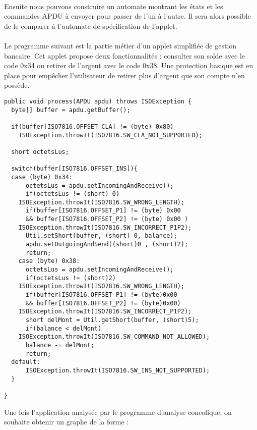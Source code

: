 \paragraph{}
Ensuite nous pouvons construire un automate montrant les états et les commandes \gls{APDU} à envoyer pour passer de l’un à l’autre. Il sera alors possible de le comparer à l’automate de spécification de l’applet.

\paragraph{}
Le programme suivant est la partie métier d’un applet simplifiée de gestion bancaire. Cet applet propose deux fonctionnalités : consulter son solde avec le code 0x34 ou retirer de l’argent avec le code 0x38. Une protection basique est en place pour empêcher l’utilisateur de retirer plus d’argent que son compte n’en possède.

\begin{verbatim}
public void process(APDU apdu) throws ISOException {
  byte[] buffer = apdu.getBuffer();
      
  if(buffer[ISO7816.OFFSET_CLA] != (byte) 0x80)
    ISOException.throwIt(ISO7816.SW_CLA_NOT_SUPPORTED);
      
  short octetsLus;
      
  switch(buffer[ISO7816.OFFSET_INS]){
  case (byte) 0x34:
      octetsLus = apdu.setIncomingAndReceive();
      if(octetsLus != (short) 0)
	ISOException.throwIt(ISO7816.SW_WRONG_LENGTH);
      if(buffer[ISO7816.OFFSET_P1] != (byte) 0x00 
	  && buffer[ISO7816.OFFSET_P2] != (byte) 0x00 )
	ISOException.throwIt(ISO7816.SW_INCORRECT_P1P2);
      Util.setShort(buffer, (short) 0, balance);
      apdu.setOutgoingAndSend((short)0 , (short)2);
      return;
    case (byte) 0x38:
      octetsLus = apdu.setIncomingAndReceive();
      if(octetsLus != (short)2)
	ISOException.throwIt(ISO7816.SW_WRONG_LENGTH);
      if(buffer[ISO7816.OFFSET_P1] != (byte)0x00 
	  && buffer[ISO7816.OFFSET_P2] != (byte)0x00)
	ISOException.throwIt(ISO7816.SW_INCORRECT_P1P2);
      short delMont = Util.getShort(buffer, (short)5);
      if(balance < delMont)
	ISOException.throwIt(ISO7816.SW_COMMAND_NOT_ALLOWED);
      balance -= delMont;
      return;
  default:
      ISOException.throwIt(ISO7816.SW_INS_NOT_SUPPORTED);
  }

}
\end{verbatim}

Une fois l'application analysée par le programme d'analyse concolique, on souhaite obtenir un graphe de la forme : 

